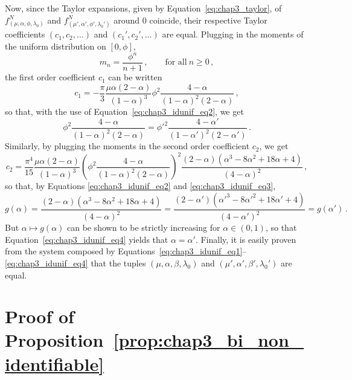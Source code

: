 \begin{subappendices}
Now, since the Taylor expansions, given by Equation~\eqref{eq:chap3_taylor}, of $f_{(\mu, \alpha, \phi, \lambda_0)}^N$ and $f_{(\mu', \alpha', \phi', \lambda_0')}^N$ around 0 coincide, their respective Taylor coefficients $(c_1, c_2, \ldots)$ and $(c_1', c_2', \ldots)$ are equal.
Plugging in the moments of the uniform distribution on $[0, \phi]$, 
\begin{equation*}
  m_n = \frac{\phi^n}{n+1}\,, \qquad \text{for all}~n \ge 0\,,
\end{equation*}
the first order coefficient $c_1$ can be written
\begin{equation*}
  c_1 = - \frac{\pi}{3} \frac{\mu\alpha(2-\alpha)}{(1-\alpha)^3} \phi^2 \frac{4-\alpha}{(1-\alpha)^2 (2-\alpha)}\,,
\end{equation*}
so that, with the use of Equation~\eqref{eq:chap3_idunif_eq2}, we get
\begin{equation}\label{eq:chap3_idunif_eq3}
  \phi^2 \frac{4-\alpha}{(1-\alpha)^2 (2-\alpha)} = \phi'^2 \frac{4-\alpha'}{(1-\alpha')^2 (2-\alpha')}\,.
\end{equation}
Similarly, by plugging the moments in the second order coefficient $c_2$, we get 
\begin{equation*}
  c_2 = \frac{\pi^4}{15} \frac{\mu\alpha(2-\alpha)}{(1-\alpha)^3} \left( \phi^2 \frac{4-\alpha}{(1-\alpha)^2(2-\alpha)} \right)^2 \frac{(2-\alpha)(\alpha^3 - 8\alpha^2 + 18\alpha + 4)}{(4 - \alpha)^2}\,,
\end{equation*}
so that, by Equations \eqref{eq:chap3_idunif_eq2} and \eqref{eq:chap3_idunif_eq3},
\begin{equation}\label{eq:chap3_idunif_eq4}
  g(\alpha) = \frac{(2-\alpha)(\alpha^3 - 8\alpha^2 + 18\alpha + 4)}{(4 - \alpha)^2} = \frac{(2-\alpha')(\alpha'^3 - 8\alpha'^2 + 18\alpha' + 4)}{(4 - \alpha')^2} = g(\alpha')\,.
\end{equation}
But $\alpha \mapsto g(\alpha)$ can be shown to be strictly increasing for $\alpha \in (0, 1)$, so that Equation~\eqref{eq:chap3_idunif_eq4} yields that $\alpha = \alpha'$.
Finally, it is easily proven from the system composed by Equations~\eqref{eq:chap3_idunif_eq1}--\eqref{eq:chap3_idunif_eq4} that the tuples $(\mu, \alpha, \beta, \lambda_0)$ and $(\mu', \alpha', \beta', \lambda_0')$ are equal.


\section{Proof of Proposition~\ref{prop:chap3_bi_non_identifiable}}\label{appendix:chap3_bi_non_identifiable}


\end{subappendices}
